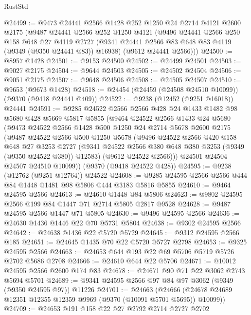 \begin{lexlean}{RustStd}
\begin{coremodule}
{\begin{coremodule}
{{{{{{{{{{{{{{{{{{{{{{{{{{{{{{{{{{{{{{{@24499 := @9473
    @24441
    @2566
    @1428
    @252
    @1250
    @24
    @2714
    @4121
    @2600
    @2175
    (@9487
      @24441
      @2566
      @252
      @1250
      @4121
      (@9496
        @24441
        @2566
        @250
        @158
        @648
        @27
        @4119
        @2727
        (@9341 @24441 @2566 @83 @648 @83 @4119 (@9349 (@9350 @24441 @83)) @16938)
        (@9612 @24441 @2566)))
@24500 := @8957 @1428
@24501 := @9153 @24500
@24502 := @24499 @24501
@24503 := @9027 @2175
@24504 := @9644 @24503
@24505 := @24502 @24504
@24506 := @9051 @2175
@24507 := @9648 @24506
@24508 := @24505 @24507
@24510 := @9653 (@9673 @1428)
@24518 := @24454 (@24459 (@24508 @24510 @10099)) (@9370 (@9418 @24441 @409))
@24522 := @9238 (@12452 (@9251 @16018)) @24441
@24591 := @9285
    @24522
    @2566
    @2566
    @428
    @24
    @1433
    @1482
    @98
    @5680
    @428
    @5669
    @5817
    @5855
    (@9464
      @24522
      @2566
      @1433
      @24
      @5680
      (@9473
        @24522
        @2566
        @1428
        @500
        @1250
        @24
        @2714
        @5678
        @2600
        @2175
        (@9487
          @24522
          @2566
          @500
          @1250
          @5678
          (@9496
            @24522
            @2566
            @420
            @158
            @648
            @27
            @3253
            @2727
            (@9341 @24522 @2566 @380 @648 @380 @3253 (@9349 (@9350 @24522 @380)) @12583)
            (@9612 @24522 @2566)))
        @24501
        @24504
        @24507
        @24510
        @10099))
    (@9370 (@9418 @24522 @428))
@24595 := @9238 (@12762 (@9251 @12764)) @24522
@24608 := @9285 @24595 @2566 @2566 @444 @84 @1448 @1481 @98 @5806 @444 @3183 @5816 @5855
@24610 := @9464 @24595 @2566
@24613 := @24610 @1448 @84 @5806
@24623 := @9802 @24595 @2566 @199 @84 @1447 @71 @2714 @5805 @2817 @9528
@24628 := @9487 @24595 @2566 @1447 @71 @5805
@24630 := @9496 @24595 @2566
@24636 := @24630 @1436 @1446 @22 @70 @5731 @5804
@24638 := @9302 @24595 @2566
@24642 := @24638 @1436 @22 @5720 @5729
@24645 := @9312 @24595 @2566 @185
@24651 := @24645 @1435 @70 @22 @5720 @5727 @2798
@24653 := @9325 @24595 @2566
@24663 := @24653 @644 @193 @22 @69 @5706 @5719 @5726 @2702 @5686 @2708
@24666 := @24610 @644 @22 @5706
@24671 := @10012 @24595 @2566 @2600 @174 @83
@24678 := @24671 @90 @71 @22 @3062 @2743 @5694 @5701
@24689 := @9341 @24595 @2566 @97 @84 @97 @3062 (@9349 (@9350 @24595 @97)) @11226
@24701 := @24663
    (@24666 (@24678 @24689 @12351 @12355 @12359 @9969 (@9370 (@10091 @5701 @5695)) @10099))
@24709 := @24653 @191 @158 @22 @27 @2792 @2714 @2727 @2702
}}}}}}}}}}}}}}}}}}}}}}}}}}}}}}}}}}}}}}}
\end{coremodule}}
\end{coremodule}
\end{lexlean}
